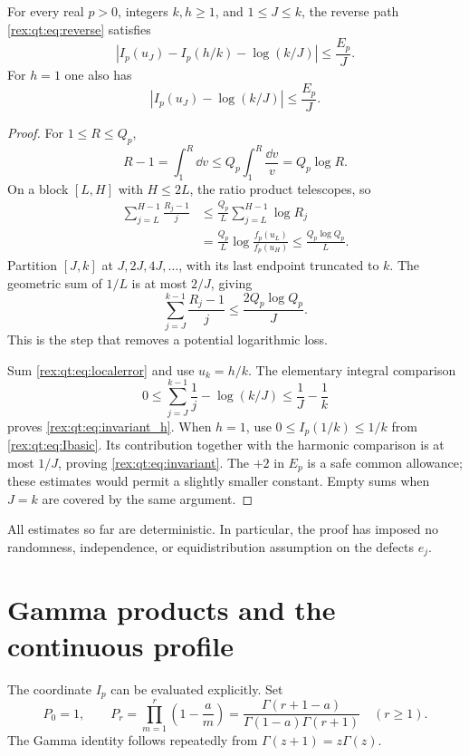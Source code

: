 \begin{theorem}\label{rex:qt:thm:invariant}
For every real $p>0$, integers $k,h\ge1$, and $1\le J\le k$, the reverse path \eqref{rex:qt:eq:reverse} satisfies
\begin{equation}\label{rex:qt:eq:invariant_h}
 \left|I_p(u_J)-I_p(h/k)-\log(k/J)\right|\le\frac{E_p}{J}.
\end{equation}
For $h=1$ one also has
\begin{equation}\label{rex:qt:eq:invariant}
 \left|I_p(u_J)-\log(k/J)\right|\le\frac{E_p}{J}.
\end{equation}
\end{theorem}
\begin{proof}
For $1\le R\le Q_p$,
\[
 R-1=\int_1^R\dd v\le Q_p\int_1^R\frac{\dd v}{v}=Q_p\log R.
\]
On a block $[L,H]$ with $H\le2L$, the ratio product telescopes, so
\begin{align*}
 \sum_{j=L}^{H-1}\frac{R_j-1}{j}
 &\le\frac{Q_p}{L}\sum_{j=L}^{H-1}\log R_j\\
 &=\frac{Q_p}{L}\log\frac{f_p(u_L)}{f_p(u_H)}
 \le\frac{Q_p\log Q_p}{L}.
\end{align*}
Partition $[J,k]$ at $J,2J,4J,\ldots$, with its last endpoint truncated to $k$. The geometric sum of $1/L$ is at most $2/J$, giving
\begin{equation}\label{rex:qt:eq:dyadicsum}
 \sum_{j=J}^{k-1}\frac{R_j-1}{j}\le\frac{2Q_p\log Q_p}{J}.
\end{equation}
This is the step that removes a potential logarithmic loss.

Sum \eqref{rex:qt:eq:localerror} and use $u_k=h/k$. The elementary integral comparison
\[
 0\le\sum_{j=J}^{k-1}\frac1j-\log(k/J)\le\frac1J-\frac1k
\]
proves \eqref{rex:qt:eq:invariant_h}. When $h=1$, use $0\le I_p(1/k)\le1/k$ from \eqref{rex:qt:eq:Ibasic}. Its contribution together with the harmonic comparison is at most $1/J$, proving \eqref{rex:qt:eq:invariant}. The $+2$ in $E_p$ is a safe common allowance; these estimates would permit a slightly smaller constant. Empty sums when $J=k$ are covered by the same argument.
\end{proof}

All estimates so far are deterministic. In particular, the proof has imposed no randomness, independence, or equidistribution assumption on the defects $e_j$.

\section{Gamma products and the continuous profile}\label{rex:qt:sec:gamma}
The coordinate $I_p$ can be evaluated explicitly. Set
\begin{equation}\label{rex:qt:eq:Pr}
 P_0=1,\qquad
 P_r=\prod_{m=1}^r\left(1-\frac a m\right)
     =\frac{\Gamma(r+1-a)}{\Gamma(1-a)\Gamma(r+1)}\quad(r\ge1).
\end{equation}
The Gamma identity follows repeatedly from $\Gamma(z+1)=z\Gamma(z)$.

